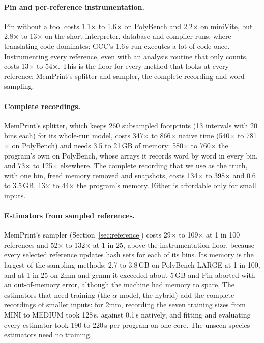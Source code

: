 \documentclass[11pt]{article}
\newcommand{\memprint}{MemPrint}
\newcommand{\secref}[1]{Section~\ref{#1}}
\begin{document}
\paragraph{Pin and per-reference instrumentation.} Pin without a tool costs 1.1$\times$ to 1.6$\times$ on PolyBench and 2.2$\times$ on miniVite, but 2.8$\times$ to 13$\times$ on the short interpreter, database and compiler runs, where translating code dominates: GCC's 1.6\,s run executes a lot of code once. Instrumenting every reference, even with an analysis routine that only counts, costs 13$\times$ to 54$\times$. This is the floor for every method that looks at every reference: \memprint{}'s splitter and sampler, the complete recording and word sampling.

\paragraph{Complete recordings.} \memprint{}'s splitter, which keeps 260 subsampled footprints (13 intervals with 20 bins each) for its whole-run model, costs 347$\times$ to 866$\times$ native time (540$\times$ to 781$\times$ on PolyBench) and needs 3.5 to 21\,GB of memory: 580$\times$ to 760$\times$ the program's own on PolyBench, whose arrays it records word by word in every bin, and 73$\times$ to 125$\times$ elsewhere. The complete recording that we use as the truth, with one bin, freed memory removed and snapshots, costs 134$\times$ to 398$\times$ and 0.6 to 3.5\,GB, 13$\times$ to 44$\times$ the program's memory. Either is affordable only for small inputs.

\paragraph{Estimators from sampled references.} \memprint{}'s sampler (\secref{sec:reference}) costs 29$\times$ to 109$\times$ at 1 in 100 references and 52$\times$ to 132$\times$ at 1 in 25, above the instrumentation floor, because every selected reference updates hash sets for each of its bins. Its memory is the largest of the sampling methods: 2.7 to 3.8\,GB on PolyBench LARGE at 1 in 100, and at 1 in 25 on 2mm and gemm it exceeded about 5\,GB and Pin aborted with an out-of-memory error, although the machine had memory to spare. The estimators that need training (the $\alpha$ model, the hybrid) add the complete recordings of smaller inputs: for 2mm, recording the seven training sizes from MINI to MEDIUM took 128\,s, against 0.1\,s natively, and fitting and evaluating every estimator took 190 to 220\,s per program on one core. The unseen-species estimators need no training.
\end{document}
